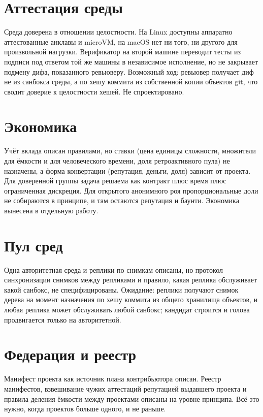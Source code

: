 \section{Аттестация среды}

Среда доверена в отношении целостности. На Linux доступны аппаратно аттестованные анклавы и microVM, на macOS нет ни того, ни другого для произвольной нагрузки. Верификатор на второй машине переводит тесты из подписи под ответом той же машины в независимое исполнение, но не закрывает подмену дифа, показанного ревьюверу. Возможный ход: ревьювер получает диф не из санбокса среды, а по хешу коммита из собственной копии объектов git, что сводит доверие к целостности хешей. Не спроектировано.

\section{Экономика}

Учёт вклада описан правилами, но ставки (цена единицы сложности, множители для ёмкости и для человеческого времени, доля ретроактивного пула) не назначены, а форма конвертации (репутация, деньги, доля) зависит от проекта. Для доверенной группы задача решаема как контракт плюс время плюс ограниченная дискреция. Для открытого анонимного роя пропорциональные доли не собираются в принципе, и там остаются репутация и баунти. Экономика вынесена в отдельную работу.

\section{Пул сред}

Одна авторитетная среда и реплики по снимкам описаны, но протокол синхронизации снимков между репликами и правило, какая реплика обслуживает какой санбокс, не специфицированы. Ожидание: реплики получают снимок дерева на момент назначения по хешу коммита из общего хранилища объектов, и любая реплика может обслуживать любой санбокс; кандидат строится и голова продвигается только на авторитетной.

\section{Федерация и реестр}

Манифест проекта как источник плана контрибьютора описан. Реестр манифестов, взвешивание чужих аттестаций репутацией выдавшего проекта и правила деления ёмкости между проектами описаны на уровне принципа. Всё это нужно, когда проектов больше одного, и не раньше.

